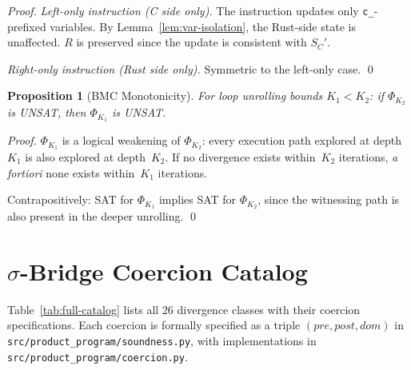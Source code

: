 \documentclass[10pt,a4paper]{article}
\newtheorem{proposition}[theorem]{Proposition}
\begin{document}
\begin{appendices}
\begin{proof}
\emph{Left-only instruction (C side only).}
The instruction updates only \texttt{c\_}-prefixed variables.  By
Lemma~\ref{lem:var-isolation}, the Rust-side state is unaffected.
$R$ is preserved since the update is consistent with $S_C'$.

\emph{Right-only instruction (Rust side only).}
Symmetric to the left-only case.  \qed
\end{proof}

\begin{proposition}[BMC Monotonicity]\label{prop:bmc-mono}
For loop unrolling bounds $K_1 < K_2$: if $\Phi_{K_2}$ is UNSAT,
then $\Phi_{K_1}$ is UNSAT.
\end{proposition}

\begin{proof}
$\Phi_{K_1}$ is a logical weakening of $\Phi_{K_2}$: every
execution path explored at depth~$K_1$ is also explored at
depth~$K_2$.  If no divergence exists within~$K_2$ iterations,
\emph{a fortiori} none exists within~$K_1$ iterations.

Contrapositively: SAT for $\Phi_{K_1}$ implies SAT for
$\Phi_{K_2}$, since the witnessing path is also present in the
deeper unrolling.  \qed
\end{proof}


\section{$\sigma$-Bridge Coercion Catalog}\label{app:sigma-catalog}

Table~\ref{tab:full-catalog} lists all 26 divergence classes with
their coercion specifications.  Each coercion is formally specified
as a triple $(\mathit{pre}, \mathit{post}, \mathit{dom})$ in
\texttt{src/product\_program/soundness.py}, with implementations
in \texttt{src/product\_program/coercion.py}.


\end{appendices}
\end{document}
